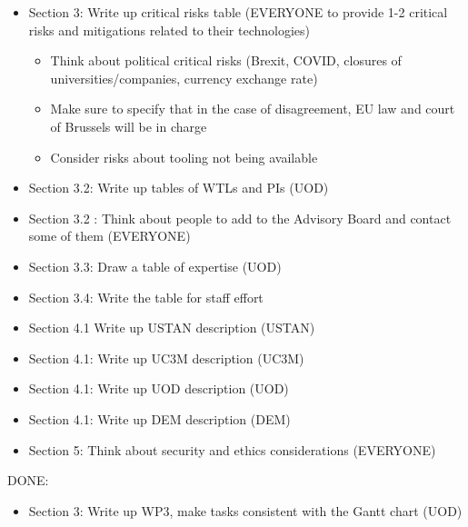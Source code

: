 \documentclass[a4paper,11pt]{article}
\begin{document}
\begin{itemize}
\item Section 3: Write up critical risks table (EVERYONE to provide 1-2 critical risks and mitigations related to their technologies)
\begin{itemize}
\item Think about political critical risks (Brexit, COVID, closures of universities/companies, currency exchange rate)
\item Make sure to specify that in the case of disagreement, EU law and court of Brussels will be in charge
\item Consider risks about tooling not being available
\end{itemize}



\item Section 3.2: Write up tables of WTLs and PIs (UOD)

\item Section 3.2 : Think about people to add to the Advisory Board and contact some of them (EVERYONE)

\item Section 3.3: Draw a table of expertise (UOD)

\item Section 3.4: Write the table for staff effort



\item Section 4.1 Write up USTAN description (USTAN)

\item Section 4.1: Write up UC3M description (UC3M)

\item Section 4.1: Write up UOD description (UOD)

\item Section 4.1: Write up DEM description (DEM)

\item Section 5: Think about security and ethics considerations (EVERYONE)
\end{itemize}

DONE:

\begin{itemize}
\item Section 3: Write up WP3, make tasks consistent with the Gantt chart (UOD)
\end{itemize}




\setcounter{page}{2}

\end{document}
